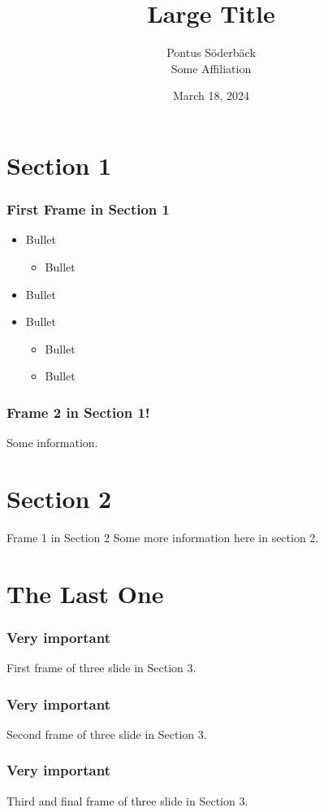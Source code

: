 \documentclass[]{beamer} %
\title[Small Title]{Large Title}
\author[Pontus Söderbäck]{{\Large Pontus Söderbäck}\\$\quad$\\{\scriptsize Some Affiliation}}
\date{March 18, 2024}
\begin{document}

{ 
\nologo
\begin{frame}[noframenumbering]
	\titlepage
\end{frame}
}

\section{Section 1}
\begin{frame}
\frametitle{First Frame in Section 1}
\begin{itemize}
	\item Bullet
\begin{itemize}
	\item Bullet
\end{itemize}
	\item Bullet
	\item Bullet
	\begin{itemize}
	\item Bullet
	\item Bullet
	\end{itemize}
\end{itemize}

\end{frame}

\begin{frame}\frametitle{Frame 2 in Section 1!}
	Some information.
\end{frame}


\section{Section 2}
\begin{frame}{Frame 1 in Section 2}
Some more information here in section 2.
\end{frame}

\section{The Last One}
\begin{frame}\frametitle{Very important}
	First frame of three slide in Section 3.
\end{frame}
\begin{frame}\frametitle{Very important}
	Second frame of three slide in Section 3.
\end{frame}
\begin{frame}\frametitle{Very important}
	Third and final frame of three slide in Section 3.
\end{frame}
\end{document}
